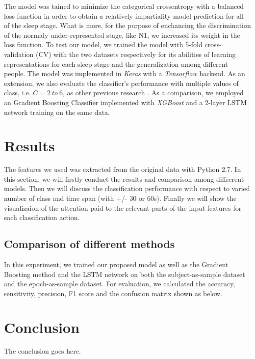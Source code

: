 \documentclass[journal]{IEEEtran}
\begin{document}
The model was tained to minimize the categorical crossentropy with a balanced loss function in order to obtain a relatively impartiality model prediction for all of the sleep stage. What is more, for the purpose of enchancing the discrimination of the normaly under-represented stage, like N1, we increased its weight in the loss function. To test our model, we trained the model with 5-fold cross-validation (CV) with the two datasets respectively for its abilities of learning representations for each sleep stage and the generalization among different people. The model was implemented in \emph{Keras} with a \emph{Tensorflow} backend. As an extension, we also evaluate the classifier's performance with multiple values of class, i.e. $C = 2\ to\ 6$, as other previous research \cite{nakamura2017complexity}. As a comparison, we employed an Gradient Boosting Classifier implemented with \emph{XGBoost} \cite{Chen2016XGBoost} and a 2-layer LSTM network training on the same data.


\section{Results}
The features we used was extracted from the original data with Python 2.7. In this section, we will firstly conduct the results and comparison among diffrerent models. Then we will discuss the classification performance with respect to varied number of class and time span (with +/- 30 or 60s). Finally we will show the visualizaion of the attention paid to the relevant parts of the input features for each classification action.

\subsection{Comparison of different methods}
In this experiment, we trained our proposed model as well as the Gradient Boosting method and the LSTM network on both the subject-as-sample dataset and the epoch-as-sample dataset. For evaluation, we calculated the accuracy, sensitivity, precision, F1 score and the confusion matrix shown as below.

\section{Conclusion}
The conclusion goes here.





\end{document}
